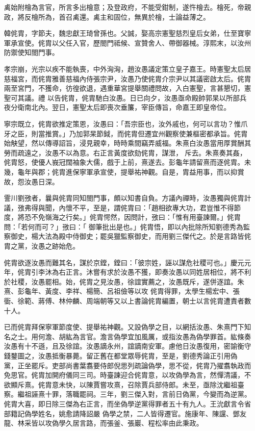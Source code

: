 \begin{pinyinscope}
 禼始附檜為言官，所言多出檜意；及登政府，不能受鉗制，遂忤檜去。檜死，帝親政，將反檜所為，首召禼還。禼主和固位，無異於檜，士論益薄之。



 韓侂胄，字節夫，魏忠獻王琦曾孫也。父誠，娶高宗憲聖慈烈皇后女弟，仕至寶寧軍承宣使。侂胄以父任入官，歷閤門祗候、宣贊舍人、帶御器械。淳熙末，以汝州防禦使知閤門事。



 孝宗崩，光宗以疾不能執喪，中外洶洶，趙汝愚議定策立皇子嘉王。時憲聖太后居慈福宮，而侂胄雅善慈福內侍張宗尹，汝愚乃使侂胄介宗尹以其議密啟太后。侂胄兩至宮門，不獲命，彷徨欲退，遇重華宮提舉關禮問故，入白憲聖，言甚懇切，憲聖可其議。禮
 以告侂胄，侂胄馳白汝愚。日已向夕，汝愚亟命殿帥郭杲以所部兵夜分衛南北內。翌日，憲聖太后即喪次垂簾，宰臣傳旨，命嘉王即皇帝位。



 寧宗既立，侂胄欲推定策恩，汝愚曰：「吾宗臣也，汝外戚也，何可以言功？惟爪牙之臣，則當推賞。」乃加郭杲節鉞，而侂胄但遷宜州觀察使兼樞密都承旨。侂胄始觖望，然以傳導詔旨，浸見親幸，時時乘間竊弄威福。朱熹白汝愚當用厚賞酬其勞而疏遠之，汝愚不以為意。右正言黃度欲劾侂胄，謀泄，
 斥去。朱熹奏其姦，侂胄怒，使優人峩冠闊袖象大儒，戲于上前，熹遂去。彭龜年請留熹而逐侂胄。未幾，龜年與郡；侂胄進保寧軍承宣使，提舉祐神觀。自是，胄益用事，而以抑賞故，怨汝愚日深。



 霅川劉㢸者，曩與侂胄同知閤門事，頗以知書自負。方議內禪時，汝愚獨與侂胄計議，㢸弗得與聞，內懷不平，至是，謂侂胄曰：「趙相欲專大功，君豈惟不得節度，將恐不免嶺海之行矣。」侂胄愕然，因問計，㢸曰：「惟有用臺諫爾。」侂胄問：「若何而可？」㢸曰：「
 御筆批出是也。」侂胄悟，即以內批除所知劉德秀為監察御史，楊大法為殿中侍御史；罷吳獵監察御史，而用劉三傑代之。於是言路皆侂胄之黨，汝愚之跡始危。



 侂胄欲逐汝愚而難其名，謀於京鏜，鏜曰：「彼宗姓，誣以謀危社稷可也。」慶元元年，侂胄引李沐為右正言。沐嘗有求於汝愚不獲，即奏汝愚以同姓居相位，將不利於社稷，汝愚罷相。始，侂胄之見汝愚，徐誼實薦之，汝愚既斥，遂併逐誼。朱熹、彭龜年、黃度、李祥、楊簡、呂祖儉等以攻
 侂胄得罪，太學生楊宏中、張衟、徐範、蔣傅、林仲麟、周端朝等又以上書論侂胄編置，朝士以言侂胄遭責者數十人。



 已而侂胄拜保寧軍節度使、提舉祐神觀。又設偽學之目，以網括汝愚、朱熹門下知名之士。用何澹、胡紘為言官。澹言偽學宜加風厲，或指汝愚為偽學罪首。紘條奏汝愚有十不遜，且及徐誼。汝愚謫永州，誼謫南安軍。慮他日汝愚復用，密諭衡守錢鍪圖之，汝愚抵衡暴薨。留正舊在都堂眾辱侂胄，至是，劉德秀論正引用偽
 黨，正坐罷斥。吏部尚書葉翥要侍郎倪思列疏論偽學，思不從，侂胄乃擢翥執政而免思官。侂胄加開府儀同三司。時臺諫迎合侂胄意，以攻偽學為言，然憚清議，不欲顯斥熹。侂胄意未快，以陳賈嘗攻熹，召除賈兵部侍郎。未至，亟除沈繼祖臺察。繼祖誣熹十罪，落職罷祠。三年，劉三傑入對，言前日偽黨，今變而為逆黨。侂胄大喜，即日除三傑為右正言，而坐偽學逆黨得罪者五十有九人。王沇獻言令省部籍記偽學姓名，姚愈請降詔嚴
 偽學之禁，二人皆得遷官。施康年、陳讜、鄧友龍、林采皆以攻偽學久居言路，而張釜、張巖、程松率由此秉政。




\end{pinyinscope}
